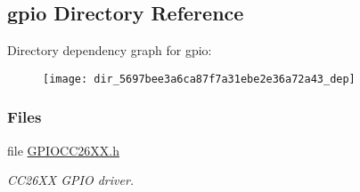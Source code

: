 \subsection{gpio Directory Reference}
\label{dir_5697bee3a6ca87f7a31ebe2e36a72a43}
Directory dependency graph for gpio\+:
\nopagebreak
\begin{figure}[H]
\begin{center}
\leavevmode
\texttt{[image: dir\_5697bee3a6ca87f7a31ebe2e36a72a43\_dep]}
\end{center}
\end{figure}
\subsubsection*{Files}
\begin{DoxyCompactItemize}
\item 
file \hyperlink{_g_p_i_o_c_c26_x_x_8h}{G\+P\+I\+O\+C\+C26\+X\+X.\+h}
\begin{DoxyCompactList}\small\item\em C\+C26\+X\+X G\+P\+I\+O driver. \end{DoxyCompactList}\end{DoxyCompactItemize}

